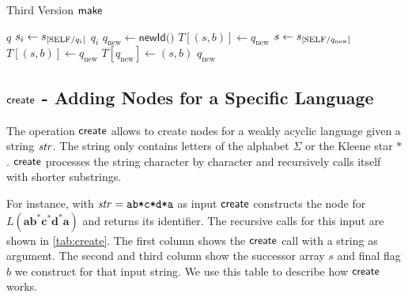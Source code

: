\begin{algorithm}[htb]
\caption{Third Version $\operatorname{\textsf{make}}$}\label{alg:makev2}
\begin{algorithmic}[1]
\Return $q$
\EndIf
{}
\State $s_{i} \gets s_{[\mathrm{SELF} / q_{i}]}$
\Return $q_{i}$
\EndIf
\EndFor
\State $q_{\text{new}} \gets \textsf{newId()}$
\State $T[(s,b)] \gets q_{\text{new}}$
\State $s \gets s_{[\mathrm{SELF} / q_{\text{new}}]}$
\State $T[(s,b)] \gets q_{\text{new}}$
\State $T[q_{\text{new}}] \gets (s,b)$
\Return $q_{\text{new}}$
\end{algorithmic}
\end{algorithm}

\subsection{$\operatorname{\textsf{create}}$ - Adding Nodes for a Specific Language}
The operation $\operatorname{\textsf{create}}$ allows to create nodes for a weakly acyclic language given a string $\mathit{str}$. The string only contains letters of the alphabet $\Sigma$ or the Kleene star $*$. $\operatorname{\textsf{create}}$ processes the string character by character and recursively calls itself with shorter substrings. 

For instance, with $\mathit{str} = \texttt{ab*c*d*a}$ as input $\operatorname{\textsf{create}}$ constructs the node for $L(\bm{ab^{*}c^{*}d^{*}a})$ and returns its identifier. The recursive calls for this input are shown in \autoref{tab:create}. The first column shows the $\operatorname{\textsf{create}}$ call with a string as argument. The second and third column show the successor array $s$ and final flag $b$ we construct for that input string. We use this table to describe how $\operatorname{\textsf{create}}$ works. 

